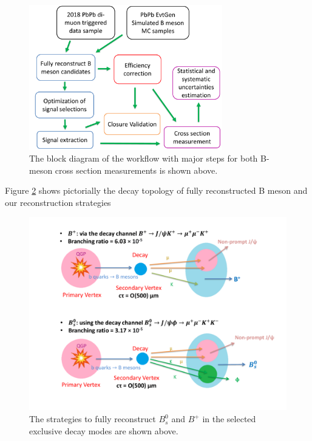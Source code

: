 \begin{figure}[hbtp]
\begin{center}
\includegraphics[width=0.75\textwidth]{Figures/Chapter5/BsBPWorkFlow.pdf}
\caption{The block diagram of the workflow with major steps for both B-meson cross section measurements is shown above.}
\label{BsBPWorkFlow}
\end{center}
\end{figure} 

Figure \ref{BsBPRECO} shows pictorially the decay topology of fully reconstructed B meson and our reconstruction strategies

\begin{figure}[hbtp]
\begin{center}
\includegraphics[width=1.05\textwidth]{Figures/Chapter5/BsBPRECO.pdf}
\caption{The strategies to fully reconstruct $B^0_s$ and $B^+$ in the selected exclusive decay modes are shown above.}
\label{BsBPRECO}
\end{center}
\end{figure} 

